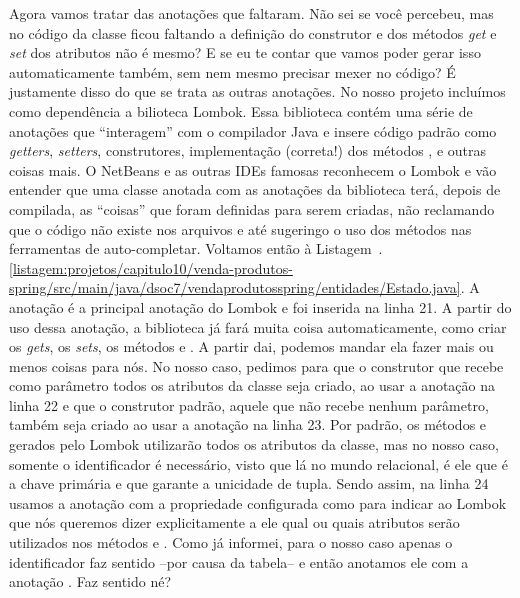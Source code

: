 
Agora vamos tratar das anotações que faltaram. Não sei se você percebeu, mas no código da classe  ficou faltando a definição do construtor e dos métodos \textit{get} e \textit{set} dos atributos não é mesmo? E se eu te contar que vamos poder gerar isso automaticamente também, sem nem mesmo precisar mexer no código? É justamente disso do que se trata as outras anotações. No nosso projeto incluímos como dependência a bilioteca Lombok. Essa biblioteca contém uma série de anotações que ``interagem'' com o compilador Java e insere código padrão como \textit{getters}, \textit{setters}, construtores, implementação (correta!) dos métodos ,  e outras coisas mais. O NetBeans e as outras IDEs famosas reconhecem o Lombok e vão entender que uma classe anotada com as anotações da biblioteca terá, depois de compilada, as ``coisas'' que foram definidas para serem criadas, não reclamando que o código não existe nos arquivos e até sugeringo o uso dos métodos nas ferramentas de auto-completar. Voltamos então à Listagem~\thechapter.\ref{listagem:projetos/capitulo10/venda-produtos-spring/src/main/java/dsoc7/vendaprodutosspring/entidades/Estado.java}. A anotação  é a principal anotação do Lombok e foi inserida na linha 21. A partir do uso dessa anotação, a biblioteca já fará muita coisa automaticamente, como criar os \textit{gets}, os \textit{sets}, os métodos  e . A partir dai, podemos mandar ela fazer mais ou menos coisas para nós. No nosso caso, pedimos para que o construtor que recebe como parâmetro todos os atributos da classe seja criado, ao usar a anotação  na linha 22 e que o construtor padrão, aquele que não recebe nenhum parâmetro, também seja criado ao usar a anotação  na linha 23. Por padrão, os métodos  e  gerados pelo Lombok utilizarão todos os atributos da classe, mas no nosso caso, somente o identificador é necessário, visto que lá no mundo relacional, é ele que é a chave primária e que garante a unicidade de tupla. Sendo assim, na linha 24 usamos a anotação  com a propriedade  configurada como  para indicar ao Lombok que nós queremos dizer explicitamente a ele qual ou quais atributos serão utilizados nos métodos  e . Como já informei, para o nosso caso apenas o identificador faz sentido --por causa da tabela-- e então anotamos ele com a anotação . Faz sentido né?


